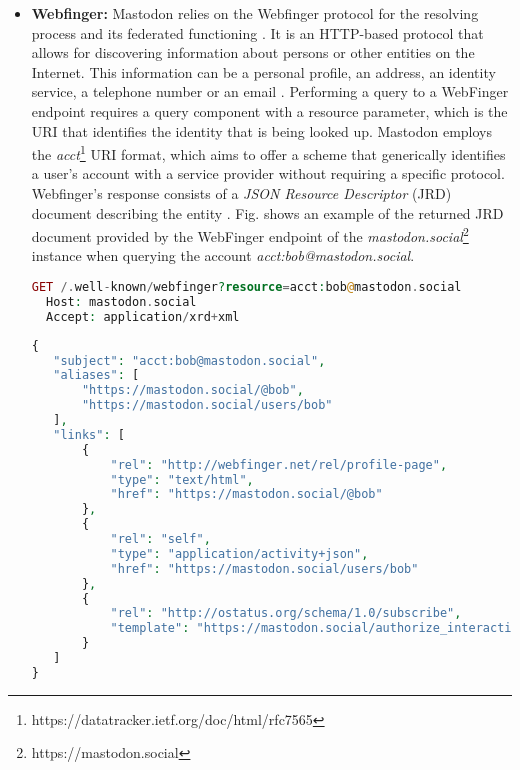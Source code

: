 \begin{itemize}
\item \textbf{Webfinger:}
Mastodon relies on the Webfinger protocol for the resolving process and its federated functioning \cite{rochko_2020}. It is an HTTP-based protocol that allows for discovering information about persons or other entities on the Internet. This information can be a personal profile, an address, an identity service, a telephone number or an email \cite{jones_salgueiro_jones_smarr_2013}. Performing a query to a WebFinger endpoint requires a query component with a resource parameter, which is the URI that identifies the identity that is being looked up. Mastodon employs the \emph{acct}\footnote{https://datatracker.ietf.org/doc/html/rfc7565} URI format, which aims to offer a scheme that generically identifies a user's account with a service provider without requiring a specific protocol. Webfinger's response consists of a \emph{JSON Resource Descriptor} (JRD) document describing the entity \cite{jones_salgueiro_jones_smarr_2013}. Fig. \label{Webfinger response from mastodon.social} shows an example of the returned JRD document provided by the WebFinger endpoint of the \emph{mastodon.social}\footnote{https://mastodon.social} instance when querying the account \emph{acct:bob@mastodon.social}.

\lstset{style=JSONStyle}
\begin{lstlisting}[language=PHP, caption=HTTP request to Webfinger endpoint, label=Webfinger request, float=h]
  GET /.well-known/webfinger?resource=acct:bob@mastodon.social
  Host: mastodon.social
  Accept: application/xrd+xml
\end{lstlisting}

\lstset{style=JSONStyle}
\begin{lstlisting}[language=PHP, caption=Webfinger response, label=Webfinger response from mastodon.social, float=h]
{
   "subject": "acct:bob@mastodon.social",
   "aliases": [
       "https://mastodon.social/@bob",
       "https://mastodon.social/users/bob"
   ],
   "links": [
       {
           "rel": "http://webfinger.net/rel/profile-page",
           "type": "text/html",
           "href": "https://mastodon.social/@bob"
       },
       {
           "rel": "self",
           "type": "application/activity+json",
           "href": "https://mastodon.social/users/bob"
       },
       {
           "rel": "http://ostatus.org/schema/1.0/subscribe",
           "template": "https://mastodon.social/authorize_interaction?uri={uri}"
       }
   ]
}
\end{lstlisting}
\end{itemize}

